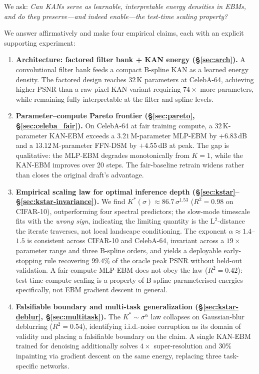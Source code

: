 \documentclass{article}
\begin{document}
We ask: \textit{Can KANs serve as learnable, interpretable energy densities in EBMs,
and do they preserve—and indeed enable—the test-time scaling property?}

We answer affirmatively and make four empirical claims, each with an explicit supporting experiment:

\begin{enumerate}
  \item \textbf{Architecture: factored filter bank + KAN energy
    (\S\ref{sec:arch}).}
    A convolutional filter bank feeds a compact B-spline KAN as a learned energy
    density. The factored design reaches $32$\,K parameters at CelebA-64, achieving
    higher PSNR than a raw-pixel KAN variant requiring $74\times$ more parameters,
    while remaining fully interpretable at the filter and spline levels.

  \item \textbf{Parameter--compute Pareto frontier
    (\S\ref{sec:pareto}, \S\ref{sec:celeba_fair}).}
    On CelebA-64 at fair training compute, a $32$\,K-parameter KAN-EBM exceeds a
    $3.21$\,M-parameter MLP-EBM by $+6.83$\,dB and a $13.12$\,M-parameter FFN-DSM
    by $+4.55$\,dB at peak. The gap is qualitative: the MLP-EBM degrades
    monotonically from $K{=}1$, while the KAN-EBM improves over 20 steps. The
    fair-baseline retrain widens rather than closes the original draft's advantage.

  \item \textbf{Empirical scaling law for optimal inference depth
    (\S\ref{sec:kstar}--\S\ref{sec:kstar-invariance}).}
    We find $K^{*}(\sigma) \approx 86.7\,\sigma^{1.53}$ ($R^{2}{=}0.98$ on
    CIFAR-10), outperforming four spectral predictors; the slow-mode timescale fits
    with the \emph{wrong sign}, indicating the limiting quantity is the
    L$^{2}$-distance the iterate traverses, not local landscape conditioning.
    The exponent $\alpha\approx 1.4$--$1.5$ is consistent across CIFAR-10 and
    CelebA-64, invariant across a $19\times$ parameter range and three B-spline
    orders, and yields a deployable early-stopping rule recovering $99.4\%$ of the
    oracle peak PSNR without held-out validation. A fair-compute MLP-EBM does not
    obey the law ($R^{2}{=}0.42$): test-time-compute scaling is a property of
    B-spline-parameterised energies specifically, not EBM gradient descent in general.

  \item \textbf{Falsifiable boundary and multi-task generalization
    (\S\ref{sec:kstar-deblur}, \S\ref{sec:multitask}).}
    The $K^{*}{\sim}\sigma^{\alpha}$ law collapses on Gaussian-blur deblurring
    ($R^{2}{=}0.54$), identifying i.i.d.-noise corruption as its domain of validity
    and placing a falsifiable boundary on the claim. A single KAN-EBM trained for
    denoising additionally solves $4\times$ super-resolution and $30\%$ inpainting
    via gradient descent on the same energy, replacing three task-specific networks.
\end{enumerate}
\end{document}
